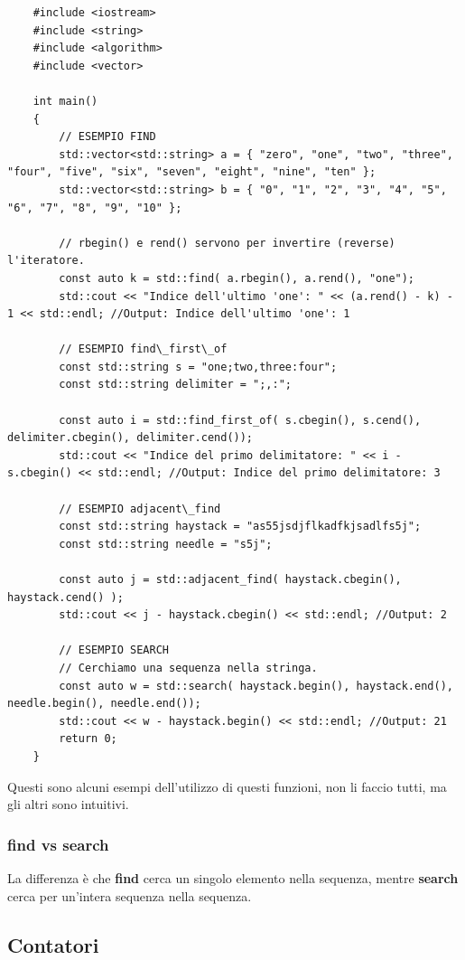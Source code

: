 \begin{lstlisting}
	#include <iostream>
	#include <string>
	#include <algorithm>
	#include <vector>
	
	int main()
	{
		// ESEMPIO FIND
		std::vector<std::string> a = { "zero", "one", "two", "three", "four", "five", "six", "seven", "eight", "nine", "ten" };
		std::vector<std::string> b = { "0", "1", "2", "3", "4", "5", "6", "7", "8", "9", "10" };
		
		// rbegin() e rend() servono per invertire (reverse) l'iteratore.
		const auto k = std::find( a.rbegin(), a.rend(), "one");
		std::cout << "Indice dell'ultimo 'one': " << (a.rend() - k) - 1 << std::endl; //Output: Indice dell'ultimo 'one': 1
		
		// ESEMPIO find\_first\_of
		const std::string s = "one;two,three:four";
		const std::string delimiter = ";,:";
		
		const auto i = std::find_first_of( s.cbegin(), s.cend(), delimiter.cbegin(), delimiter.cend());
		std::cout << "Indice del primo delimitatore: " << i - s.cbegin() << std::endl; //Output: Indice del primo delimitatore: 3
		
		// ESEMPIO adjacent\_find
		const std::string haystack = "as55jsdjflkadfkjsadlfs5j";
		const std::string needle = "s5j";
		
		const auto j = std::adjacent_find( haystack.cbegin(), haystack.cend() );
		std::cout << j - haystack.cbegin() << std::endl; //Output: 2
		
		// ESEMPIO SEARCH
		// Cerchiamo una sequenza nella stringa.
		const auto w = std::search( haystack.begin(), haystack.end(), needle.begin(), needle.end());
		std::cout << w - haystack.begin() << std::endl; //Output: 21
		return 0;
	}
\end{lstlisting}

\textsf{\small Questi sono alcuni esempi dell'utilizzo di questi funzioni, non li faccio tutti, ma gli altri sono intuitivi.} \\

\subsubsection{find vs search}

\textsf{\small La differenza è che \textbf{find} cerca un singolo elemento nella sequenza, mentre \textbf{search} cerca per un'intera sequenza nella sequenza. } \\

\subsection{Contatori}

